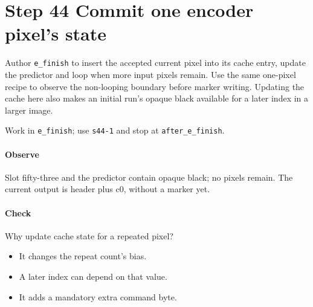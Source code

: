 \section{Step 44 Commit one encoder pixel’s state}\label{qoi-s44}
Author \texttt{e\_finish} to insert the accepted current pixel into its cache entry, update the predictor and loop when more input pixels remain. Use the same one-pixel recipe to observe the non-looping boundary before marker writing. Updating the cache here also makes an initial run’s opaque black available for a later index in a larger image.

Work in \texttt{e\_finish}; use \texttt{s44-1} and stop at \texttt{after\_e\_finish}.

\paragraph{Observe} Slot fifty-three and the predictor contain opaque black; no pixels remain. The current output is header plus c0, without a marker yet.

\paragraph{Check} Why update cache state for a repeated pixel?
\begin{itemize}
  \item[A.] It changes the repeat count’s bias.
  \item[B.] A later index can depend on that value.
  \item[C.] It adds a mandatory extra command byte.
\end{itemize}
